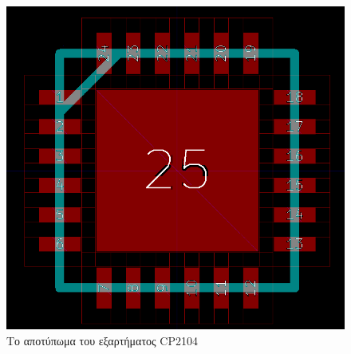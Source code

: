 \documentclass[a4paper]{article}
\begin{document}
\begin{figure}
  \begin{center}
    \includegraphics[width=.5\textwidth]{img/footed-circ-cp}
    \caption{Το αποτύπωμα του εξαρτήματος CP2104}
    \label{fig:footed-circ-cp}
  \end{center}
\end{figure}

\end{document}
